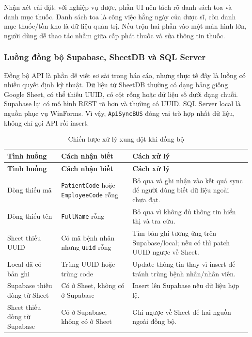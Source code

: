 \documentclass[12pt,a4paper]{article}
\numberwithin{figure}{subsection}
\numberwithin{table}{subsection}
\begin{document}
Nhận xét cài đặt: với nghiệp vụ dược, phần UI nên tách rõ danh sách toa và danh mục thuốc. Danh sách toa là công việc hằng ngày của dược sĩ, còn danh mục thuốc/tồn kho là dữ liệu quản trị. Nếu trộn hai phần vào một màn hình lớn, người dùng dễ thao tác nhầm giữa cấp phát thuốc và sửa thông tin thuốc.

\subsubsection{Luồng đồng bộ Supabase, SheetDB và SQL Server}

Đồng bộ API là phần dễ viết sơ sài trong báo cáo, nhưng thực tế đây là luồng có nhiều quyết định kỹ thuật. Dữ liệu từ SheetDB thường có dạng bảng giống Google Sheet, có thể thiếu UUID, có cột rỗng hoặc dữ liệu số dưới dạng chuỗi. Supabase lại có mô hình REST rõ hơn và thường có UUID. SQL Server local là nguồn phục vụ WinForms. Vì vậy, \texttt{ApiSyncBUS} đóng vai trò hợp nhất dữ liệu, không chỉ gọi API rồi insert.

\begin{longtable}{|p{3.4cm}|p{4.6cm}|p{5.6cm}|}
\caption{Chiến lược xử lý xung đột khi đồng bộ} \\
\hline
\textbf{Tình huống} & \textbf{Cách nhận biết} & \textbf{Cách xử lý} \\
\hline
\endfirsthead
\hline
\textbf{Tình huống} & \textbf{Cách nhận biết} & \textbf{Cách xử lý} \\
\hline
\endhead
Dòng thiếu mã & \texttt{PatientCode} hoặc \texttt{EmployeeCode} rỗng & Bỏ qua và ghi nhận vào kết quả sync để người dùng biết dữ liệu ngoài chưa đạt. \\
\hline
Dòng thiếu tên & \texttt{FullName} rỗng & Bỏ qua vì không đủ thông tin hiển thị và tra cứu. \\
\hline
Sheet thiếu UUID & Có mã bệnh nhân nhưng \texttt{uuid} rỗng & Tìm bản ghi tương ứng trên Supabase/local; nếu có thì patch UUID ngược về Sheet. \\
\hline
Local đã có bản ghi & Trùng UUID hoặc trùng code & Update thông tin thay vì insert để tránh trùng bệnh nhân/nhân viên. \\
\hline
Supabase thiếu dòng từ Sheet & Có ở Sheet, không có ở Supabase & Insert lên Supabase nếu dữ liệu hợp lệ. \\
\hline
Sheet thiếu dòng từ Supabase & Có ở Supabase, không có ở Sheet & Ghi ngược về Sheet để hai nguồn ngoài đồng bộ. \\
\hline
\end{longtable}
\end{document}
